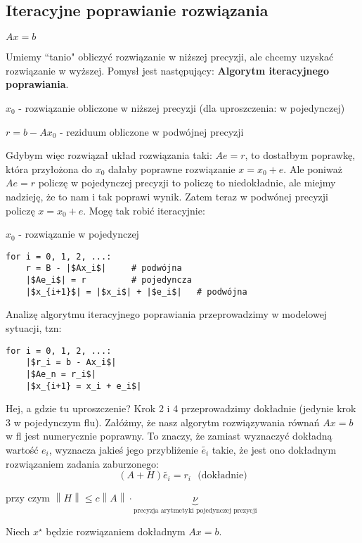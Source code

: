 \documentclass[hidelinks,a4paper,fleqn,oneside]{book}
\newcommand{\norm}[1]{\left\lVert#1\right\rVert}
\begin{document}
\subsection{Iteracyjne poprawianie rozwiązania}

$Ax = b$

Umiemy ``tanio" obliczyć rozwiązanie w niższej precyzji, ale chcemy uzyskać rozwiązanie w wyższej. Pomysł jest następujący: \textbf{Algorytm iteracyjnego poprawiania}.

$x_0$ - rozwiązanie obliczone w niższej precyzji (dla uproszczenia: w pojedynczej)

$r = b-Ax_0$ - reziduum obliczone w podwójnej precyzji

Gdybym więc rozwiązał układ rozwiązania taki: $Ae = r$, to dostałbym poprawkę, która przyłożona do $x_0$ dałaby poprawne rozwiązanie $x = x_0 + e$. Ale poniważ $Ae = r$ policzę w pojedynczej precyzji to policzę to niedokładnie, ale miejmy nadzieję, że to nam i tak poprawi wynik. Zatem teraz w podwónej precyzji policzę $x = x_0 + e$. Mogę tak robić iteracyjnie:

$x_0$ - rozwiązanie w pojedynczej
\begin{verbatim}
for i = 0, 1, 2, ...:
    r = B - |$Ax_i$|     # podwójna
    |$Ae_i$| = r         # pojedyncza
    |$x_{i+1}$| = |$x_i$| + |$e_i$|   # podwójna
\end{verbatim}


Analizę algorytmu iteracyjnego poprawiania przeprowadzimy w modelowej sytuacji, tzn:
\begin{verbatim}
for i = 0, 1, 2, ...:
    |$r_i = b - Ax_i$|
    |$Ae_n = r_i$|
    |$x_{i+1} = x_i + e_i$|
\end{verbatim}
Hej, a gdzie tu uproszczenie? Krok 2 i 4 przeprowadzimy dokładnie (jedynie krok 3 w pojedynczym flu). Załóżmy, że nasz algorytm rozwiązywania równań $Ax = b$ w fl jest numerycznie poprawny. To znaczy, że zamiast wyznaczyć dokładną wartość $e_i$, wyznacza jakieś jego przybliżenie $\tilde{e_i}$ takie, że jest ono dokładnym rozwiązaniem zadania zaburzonego:
\[
	(A + H)\tilde{e_i} = r_i \ \ \ \textrm{(dokładnie)}
\]

przy czym $\norm{H} \leq c \norm{A} \cdot \underbrace{\nu}_{\textrm{precyzja arytmetyki pojedynczej prezycji}}$

Niech $x^\star$ będzie rozwiązaniem dokładnym $Ax = b$.
\end{document}
